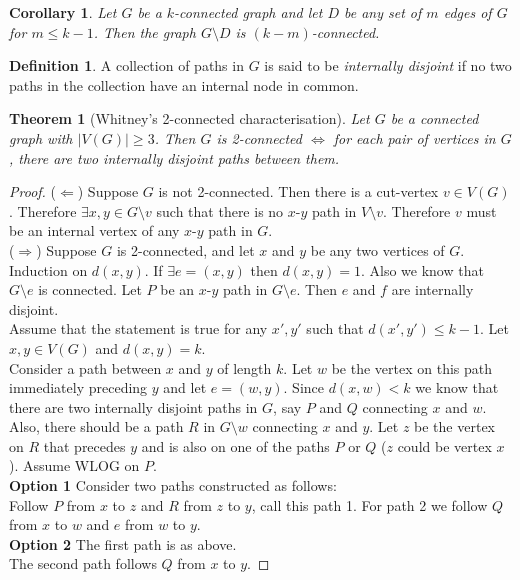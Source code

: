 \documentclass{article}
\newtheorem*{thm}{Theorem}
\newtheorem*{cor}{Corollary}
\theoremstyle{definition}
\newtheorem*{defn}{Definition}
\begin{document}
\begin{cor}
Let $G$ be a $k$-connected graph and let $D$ be any set of $m$ edges of $G$ for $m\le k-1$.
Then the graph $G\setminus D$ is $(k-m)$-connected.
\end{cor}

\begin{defn}
A collection of paths in $G$ is said to be \emph{internally disjoint} if no two paths in the collection have an internal node in common.
\end{defn}

\begin{thm}[Whitney's 2-connected characterisation]
Let $G$ be a connected graph with $|V(G)| \ge 3$.
Then $G$ is 2-connected $\iff$ for each pair of vertices in $G$, there are two internally disjoint paths between them.
\end{thm}

\begin{proof}
($\Leftarrow$) Suppose $G$ is not 2-connected.
Then there is a cut-vertex $v\in V(G)$.
Therefore $\exists x,y\in G\setminus v$ such that there is no $x$-$y$ path in $V\setminus v$.
Therefore $v$ must be an internal vertex of any $x$-$y$ path in $G$. \\
($\Rightarrow$) Suppose $G$ is 2-connected, and let $x$ and $y$ be any two vertices of $G$.
Induction on $d(x,y)$.
If $\exists e=(x,y)$ then $d(x,y) = 1$.
Also we know that $G\setminus e$ is connected.
Let $P$ be an $x$-$y$ path in $G\setminus e$.
Then $e$ and $f$ are internally disjoint. \\
Assume that the statement is true for any $x',y'$ such that $d(x',y')\le k-1$.
Let $x,y\in V(G)$ and $d(x,y) = k$. \\
Consider a path between $x$ and $y$ of length $k$.
Let $w$ be the vertex on this path immediately preceding $y$ and let $e=(w,y)$.
Since $d(x,w)<k$ we know that there are two internally disjoint paths in $G$, say $P$ and $Q$ connecting $x$ and $w$.
Also, there should be a path $R$ in $G\setminus w$ connecting $x$ and $y$.
Let $z$ be the vertex on $R$ that precedes $y$ and is also on one of the paths $P$ or $Q$ ($z$ could be vertex $x$).
Assume WLOG on $P$. \\
\textbf{Option 1}
Consider two paths constructed as follows: \\
Follow $P$ from $x$ to $z$ and $R$ from $z$ to $y$, call this path 1.
For path 2 we follow $Q$ from $x$ to $w$ and $e$ from $w$ to $y$. \\
\textbf{Option 2}
The first path is as above. \\
The second path follows $Q$ from $x$ to $y$.
\end{proof}
\end{document}
